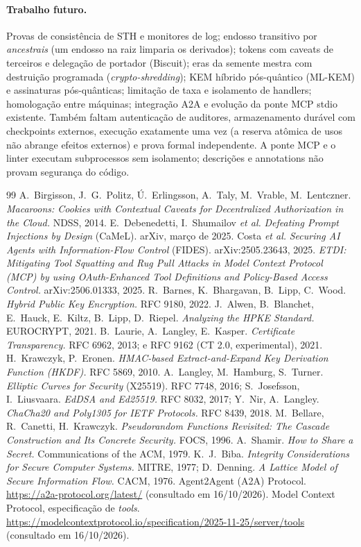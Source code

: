 \documentclass[11pt,a4paper]{article}
\theoremstyle{plain}
\theoremstyle{definition}
\theoremstyle{remark}
\begin{document}
\paragraph{Trabalho futuro.} Provas de consistência de STH e monitores de log; endosso transitivo por \emph{ancestrais} (um endosso na raiz limparia os derivados); tokens com caveats de terceiros e delegação de portador (Biscuit); eras da semente mestra com destruição programada (\emph{crypto-shredding}); KEM híbrido pós-quântico (ML-KEM) e assinaturas pós-quânticas; limitação de taxa e isolamento de handlers; homologação entre máquinas; integração A2A e evolução da ponte MCP stdio existente. Também faltam autenticação de auditores, armazenamento durável com checkpoints externos, execução exatamente uma vez (a reserva atômica de usos não abrange efeitos externos) e prova formal independente. A ponte MCP e o linter executam subprocessos sem isolamento; descrições e annotations não provam segurança do código.

\begin{thebibliography}{99}\small
{} A.~Birgisson, J.~G.~Politz, Ú.~Erlingsson, A.~Taly, M.~Vrable, M.~Lentczner. \emph{Macaroons: Cookies with Contextual Caveats for Decentralized Authorization in the Cloud.} NDSS, 2014.
 E.~Debenedetti, I.~Shumailov \emph{et al.} \emph{Defeating Prompt Injections by Design} (CaMeL). arXiv, março de 2025.
 Costa \emph{et al.} \emph{Securing AI Agents with Information-Flow Control} (FIDES). arXiv:2505.23643, 2025.
 \emph{ETDI: Mitigating Tool Squatting and Rug Pull Attacks in Model Context Protocol (MCP) by using OAuth-Enhanced Tool Definitions and Policy-Based Access Control.} arXiv:2506.01333, 2025.
 R.~Barnes, K.~Bhargavan, B.~Lipp, C.~Wood. \emph{Hybrid Public Key Encryption.} RFC 9180, 2022.
 J.~Alwen, B.~Blanchet, E.~Hauck, E.~Kiltz, B.~Lipp, D.~Riepel. \emph{Analyzing the HPKE Standard.} EUROCRYPT, 2021.
 B.~Laurie, A.~Langley, E.~Kasper. \emph{Certificate Transparency.} RFC 6962, 2013; e RFC 9162 (CT 2.0, experimental), 2021.
 H.~Krawczyk, P.~Eronen. \emph{HMAC-based Extract-and-Expand Key Derivation Function (HKDF).} RFC 5869, 2010.
 A.~Langley, M.~Hamburg, S.~Turner. \emph{Elliptic Curves for Security} (X25519). RFC 7748, 2016; S.~Josefsson, I.~Liusvaara. \emph{EdDSA and Ed25519.} RFC 8032, 2017; Y.~Nir, A.~Langley. \emph{ChaCha20 and Poly1305 for IETF Protocols.} RFC 8439, 2018.
 M.~Bellare, R.~Canetti, H.~Krawczyk. \emph{Pseudorandom Functions Revisited: The Cascade Construction and Its Concrete Security.} FOCS, 1996.
 A.~Shamir. \emph{How to Share a Secret.} Communications of the ACM, 1979.
 K.~J.~Biba. \emph{Integrity Considerations for Secure Computer Systems.} MITRE, 1977; D.~Denning. \emph{A Lattice Model of Secure Information Flow.} CACM, 1976.
 Agent2Agent (A2A) Protocol. \url{https://a2a-protocol.org/latest/} (consultado em 16/10/2026).
 Model Context Protocol, especificação de \emph{tools}. \url{https://modelcontextprotocol.io/specification/2025-11-25/server/tools} (consultado em 16/10/2026).
\end{thebibliography}
\end{document}
